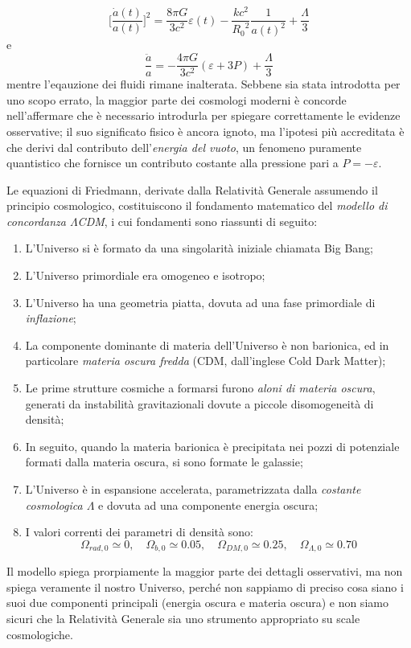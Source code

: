 \begin{equation}
    \Bigg[\frac{\dot{a}(t)}{a(t)}\Bigg]^2=\frac{8\pi G}{3c^2}\varepsilon (t)-\frac{kc^2}{{R_0}^2}\frac{1}{a(t)^2}+\frac{\Lambda}{3}
\end{equation}
e
\begin{equation}
    \frac{\ddot{a}}{a} = -\frac{4\pi G}{3c^2}(\varepsilon+3P)+\frac{\Lambda}{3}
\end{equation}
mentre l'eqauzione dei fluidi rimane inalterata.
Sebbene sia stata introdotta per uno scopo errato, la maggior parte dei cosmologi moderni è concorde nell'affermare che è necessario introdurla per spiegare correttamente le evidenze osservative; il suo significato fisico è ancora ignoto, ma l'ipotesi più accreditata è che derivi dal contributo dell'\emph{energia del vuoto}, un fenomeno puramente quantistico che fornisce un contributo costante alla pressione pari a $P=-\varepsilon$.

Le equazioni di Friedmann, derivate dalla Relatività Generale assumendo il principio cosmologico, costituiscono il fondamento matematico del \emph{modello di concordanza $\Lambda$CDM}, i cui fondamenti sono riassunti di seguito:
\begin{enumerate}
    \item L'Universo si è formato da una singolarità iniziale chiamata Big Bang;
    \item L'Universo primordiale era omogeneo e isotropo;
    \item L'Universo ha una geometria piatta, dovuta ad una fase primordiale di \emph{inflazione};
    \item La componente dominante di materia dell'Universo è non barionica, ed in particolare \emph{materia oscura fredda} (CDM, dall'inglese Cold Dark Matter);
    \item Le prime strutture cosmiche a formarsi furono \emph{aloni di materia oscura}, generati da instabilità gravitazionali dovute a piccole disomogeneità di densità;
    \item In seguito, quando la materia barionica è precipitata nei pozzi di potenziale formati dalla materia oscura, si sono formate le galassie;
    \item L'Universo è in espansione accelerata, parametrizzata dalla \emph{costante cosmologica $\Lambda$} e dovuta ad una componente energia oscura;
    \item I valori correnti dei parametri di densità sono:
          \begin{equation*}
              \Omega_{rad,0}\simeq 0, \quad \Omega_{b,0}\simeq 0.05, \quad \Omega_{DM,0}\simeq 0.25, \quad \Omega_{\Lambda,0}\simeq 0.70
          \end{equation*}
\end{enumerate}
Il modello spiega prorpiamente la maggior parte dei dettagli osservativi, ma non spiega veramente il nostro Universo, perché non sappiamo di preciso cosa siano i suoi due componenti principali (energia oscura e materia oscura) e non siamo sicuri che la Relatività Generale sia uno strumento appropriato su scale cosmologiche.